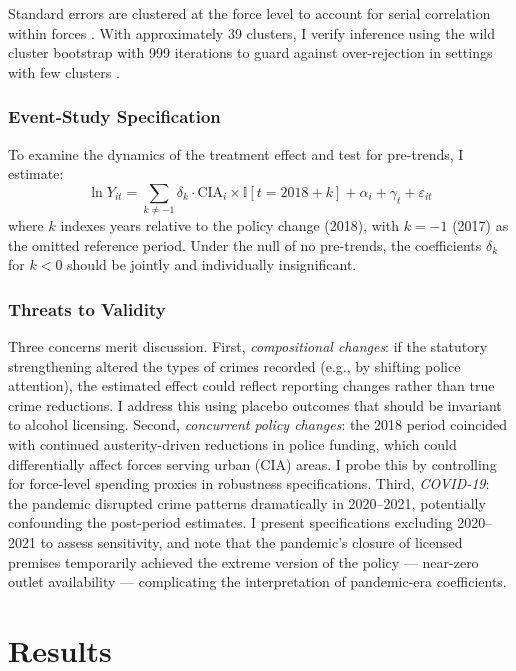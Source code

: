 \documentclass[12pt]{article}
\newcommand{\ind}{\mathbb{I}}
\begin{document}
Standard errors are clustered at the force level to account for serial correlation within forces \citep{bertrand2004much}. With approximately 39 clusters, I verify inference using the wild cluster bootstrap with 999 iterations to guard against over-rejection in settings with few clusters \citep{cameron2008bootstrap, mackinnon2019wild}.

\subsubsection*{Event-Study Specification} To examine the dynamics of the treatment effect and test for pre-trends, I estimate:
\begin{equation}
\ln Y_{it} = \sum_{k \neq -1} \delta_k \cdot \text{CIA}_i \times \ind[t = 2018 + k] + \alpha_i + \gamma_t + \varepsilon_{it}
\label{eq:eventstudy}
\end{equation}
where $k$ indexes years relative to the policy change (2018), with $k = -1$ (2017) as the omitted reference period. Under the null of no pre-trends, the coefficients $\delta_k$ for $k < 0$ should be jointly and individually insignificant.

\subsubsection*{Threats to Validity} Three concerns merit discussion. First, \emph{compositional changes}: if the statutory strengthening altered the types of crimes recorded (e.g., by shifting police attention), the estimated effect could reflect reporting changes rather than true crime reductions. I address this using placebo outcomes that should be invariant to alcohol licensing. Second, \emph{concurrent policy changes}: the 2018 period coincided with continued austerity-driven reductions in police funding, which could differentially affect forces serving urban (CIA) areas. I probe this by controlling for force-level spending proxies in robustness specifications. Third, \emph{COVID-19}: the pandemic disrupted crime patterns dramatically in 2020--2021, potentially confounding the post-period estimates. I present specifications excluding 2020--2021 to assess sensitivity, and note that the pandemic's closure of licensed premises temporarily achieved the extreme version of the policy --- near-zero outlet availability --- complicating the interpretation of pandemic-era coefficients.


\section{Results}
\label{sec:results}
\end{document}
